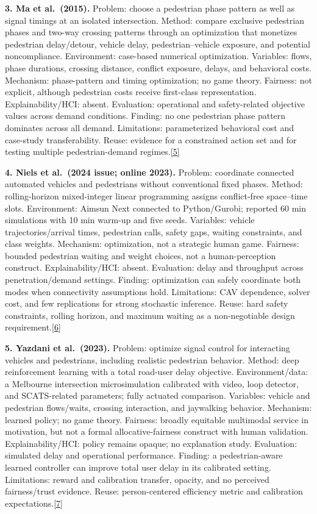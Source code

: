 \documentclass[
  english,
  11pt,
  a4paper,
]{article}
\begin{document}
\textbf{3. Ma et al.~(2015).} Problem: choose a pedestrian phase pattern
as well as signal timings at an isolated intersection. Method: compare
exclusive pedestrian phases and two-way crossing patterns through an
optimization that monetizes pedestrian delay/detour, vehicle delay,
pedestrian--vehicle exposure, and potential noncompliance. Environment:
case-based numerical optimization. Variables: flows, phase durations,
crossing distance, conflict exposure, delays, and behavioral costs.
Mechanism: phase-pattern and timing optimization; no game theory.
Fairness: not explicit, although pedestrian costs receive first-class
representation. Explainability/HCI: absent. Evaluation: operational and
safety-related objective values across demand conditions. Finding: no
one pedestrian phase pattern dominates across all demand. Limitations:
parameterized behavioral cost and case-study transferability. Reuse:
evidence for a constrained action set and for testing multiple
pedestrian-demand regimes.\hyperref[source-5]{[5]}

\textbf{4. Niels et al.~(2024 issue; online 2023).} Problem: coordinate
connected automated vehicles and pedestrians without conventional fixed
phases. Method: rolling-horizon mixed-integer linear programming assigns
conflict-free space--time slots. Environment: Aimsun Next connected to
Python/Gurobi; reported 60 min simulations with 10 min warm-up and five
seeds. Variables: vehicle trajectories/arrival times, pedestrian calls,
safety gaps, waiting constraints, and class weights. Mechanism:
optimization, not a strategic human game. Fairness: bounded pedestrian
waiting and weight choices, not a human-perception construct.
Explainability/HCI: absent. Evaluation: delay and throughput across
penetration/demand settings. Finding: optimization can safely coordinate
both modes when connectivity assumptions hold. Limitations: CAV
dependence, solver cost, and few replications for strong stochastic
inference. Reuse: hard safety constraints, rolling horizon, and maximum
waiting as a non-negotiable design requirement.\hyperref[source-6]{[6]}

\textbf{5. Yazdani et al.~(2023).} Problem: optimize signal control for
interacting vehicles and pedestrians, including realistic pedestrian
behavior. Method: deep reinforcement learning with a total road-user
delay objective. Environment/data: a Melbourne intersection
microsimulation calibrated with video, loop detector, and SCATS-related
parameters; fully actuated comparison. Variables: vehicle and pedestrian
flows/waits, crossing interaction, and jaywalking behavior. Mechanism:
learned policy; no game theory. Fairness: broadly equitable multimodal
service in motivation, but not a formal allocative-fairness construct
with human validation. Explainability/HCI: policy remains opaque; no
explanation study. Evaluation: simulated delay and operational
performance. Finding: a pedestrian-aware learned controller can improve
total user delay in its calibrated setting. Limitations: reward and
calibration transfer, opacity, and no perceived fairness/trust evidence.
Reuse: person-centered efficiency metric and calibration
expectations.\hyperref[source-7]{[7]}
\end{document}
